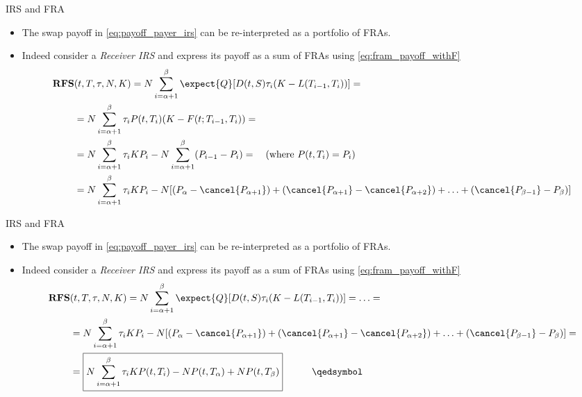 \documentclass{beamer}
\begin{document}
\begin{frame}{IRS and FRA}
	\begin{itemize}
		\item The swap payoff in \cref{eq:payoff_payer_irs} can be re-interpreted as a portfolio of FRAs.
		\item Indeed consider a \emph{Receiver IRS} and express its payoff as a sum of FRAs using \cref{eq:fram_payoff_withF}
		\begin{equation*}
			\begin{aligned}
				\textbf{RFS}&(t,T,\tau,N,K) = N\sum_{i=\alpha+1}^{\beta}\expect{Q}[D(t,S)\tau_i(K - L(T_{i-1},T_i))]=\\
				&=N\sum_{i=\alpha+1}^{\beta}\tau_i P(t,T_i)(K-F(t;T_{i-1},T_i))=\\
				&=N\sum_{i=\alpha+1}^{\beta}\tau_i KP_i-N\sum_{i=\alpha+1}^{\beta}(P_{i-1}-P_i)=\quad (\text{where }P(t, T_i) = P_i) \\
				&=N\sum_{i=\alpha+1}^{\beta}\tau_i KP_i-N[(P_\alpha -\cancel{P_{\alpha+1}}) + (\cancel{P_{\alpha+1}} - \cancel{P_{\alpha+2}}) + \ldots + (\cancel{P_{\beta-1}} - P_{\beta})] \\
			\end{aligned}
		\end{equation*}
	\end{itemize}
\end{frame}

\begin{frame}{IRS and FRA}
	\begin{itemize}
		\item The swap payoff in \cref{eq:payoff_payer_irs} can be re-interpreted as a portfolio of FRAs.
		\item Indeed consider a \emph{Receiver IRS} and express its payoff as a sum of FRAs using \cref{eq:fram_payoff_withF}
		\begin{equation}
			\begin{aligned}
				\textbf{RFS}&(t,T,\tau,N,K) = 	N\sum_{i=\alpha+1}^{\beta}\expect{Q}[D(t,S)\tau_i(K - L(T_{i-1},T_i))]= \ldots =\\
				&=N\sum_{i=\alpha+1}^{\beta}\tau_i KP_i-N[(P_\alpha -\cancel{P_{\alpha+1}}) + (\cancel{P_{\alpha+1}} - \cancel{P_{\alpha+2}}) + \ldots + (\cancel{P_{\beta-1}} - P_{\beta})] =\\
                &=\boxed{N\sum_{i=\alpha+1}^{\beta}\tau_i KP(t,T_i)-NP(t,T_\alpha)+NP(t,T_\beta)}\quad\quad\quad\qedsymbol
			\end{aligned}
		\label{eq:swap_as_sum_fra}
		\end{equation}
	\end{itemize}
\end{frame}
\end{document}
